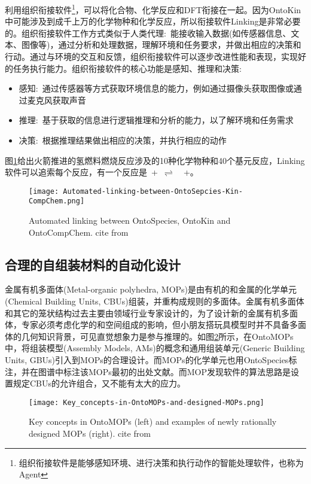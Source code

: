 利用组织衔接软件\footnote{组织衔接软件是能够感知环境、进行决策和执行动作的智能处理软件，也称为\textrm{Agent}}，可以将化合物、化学反应和\textrm{DFT}衔接在一起。因为\textrm{OntoKin}中可能涉及到成千上万的化学物种和化学反应，所以衔接软件\textrm{Linking}是非常必要的。组织衔接软件工作方式类似于人类代理:~能接收输入数据(如传感器信息、文本、图像等)，通过分析和处理数据，理解环境和任务要求，并做出相应的决策和行动。通过与环境的交互和反馈，组织衔接软件可以逐步改进性能和表现，实现好的任务执行能力。组织衔接软件的核心功能是感知、推理和决策:
\begin{itemize}
	\item 感知:~通过传感器等方式获取环境信息的能力，例如通过摄像头获取图像或通过麦克风获取声音
	\item 推理:~基于获取的信息进行逻辑推理和分析的能力，以了解环境和任务需求
	\item 决策:~根据推理结果做出相应的决策，并执行相应的动作 
\end{itemize}
图\ref{Fig:Automated-linking-between-OntoSpecies-Kin-CompChem}给出火箭推进的氢燃料燃烧反应涉及的10种化学物种和40个基元反应，\textrm{Linking}软件可以追索每个反应，有一个反应是~+~$\rightleftharpoons$~~+。
\begin{figure}[h!]
\centering
\texttt{[image: Automated-linking-between-OntoSepcies-Kin-CompChem.png]}
\caption{\small\textrm{Automated linking between OntoSpecies, OntoKin and OntoCompChem. cite from\cite{ACR56-128_2023}}}%
\label{Fig:Automated-linking-between-OntoSpecies-Kin-CompChem}
\end{figure}
\subsection{合理的自组装材料的自动化设计}
金属有机多面体\textrm{(Metal-organic polyhedra, MOPs)}是由有机的和金属的化学单元\textrm{(Chemical Building Units, CBUs)}组装，并重构成规则的多面体。金属有机多面体和其它的笼状结构过去主要由领域行业专家设计的，为了设计新的金属有机多面体，专家必须考虑化学的和空间组成的影响，但小朋友搭玩具模型时并不具备多面体的几何知识背景，可见直觉想象力是参与推理的。如图\ref{Fig:OntoMOPs-MOPs}所示，在\textrm{OntoMOPs}中，将组装模型\textrm{(Assembly Models, AMs)}的概念和通用组装单元\textrm{(Generic Building Units, GBUs)}引入到\textrm{MOPs}的合理设计。而\textrm{MOPs}的化学单元也用\textrm{OntoSpecies}标注，并在图谱中标注该\textrm{MOPs}最初的出处文献。而\textrm{MOP}发现软件的算法思路是设置规定\textrm{CBUs}的允许组合，又不能有太大的应力。
\begin{figure}[h!]
\centering
\texttt{[image: Key\_concepts-in-OntoMOPs-and-designed-MOPs.png]}
\caption{\small\textrm{Key concepts in OntoMOPs (left) and examples of newly rationally designed MOPs (right). cite from\cite{ACR56-128_2023}}}%
\label{Fig:OntoMOPs-MOPs}
\end{figure}
